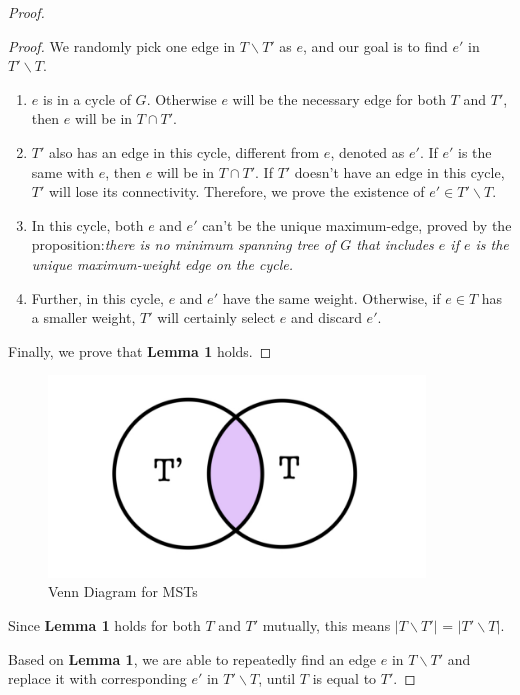 \documentclass[12pt,a4paper]{article}
\theoremstyle{definition}
\begin{document}
\begin{enumerate}
\begin{enumerate}
\begin{proof}
\begin{proof}
		We randomly pick one edge in $T\backslash T'$ as $e$, and our goal is to find $e'$ in $T'\backslash T$.
		\begin{enumerate}
		    \item 
		$e$ is in a cycle of $G$. Otherwise $e$ will be the necessary edge for both $T$ and $T'$, then $e$ will be in $T\cap T'$.
	
	    \item
	    $T'$ also has an edge in this cycle, different from $e$, denoted as $e'$. If $e'$ is the same with $e$, then $e$ will be in $T\cap T'$. If $T'$ doesn't have an edge in this cycle, $T'$ will lose its connectivity. Therefore, we prove the existence of $e'\in T'\backslash T$.
	    	\item
	    In this cycle, both $e$ and $e'$ can't be the unique maximum-edge, proved by the proposition:\textit{there is no minimum spanning tree of $G$ that includes $e$ if $e$ is the unique maximum-weight edge on the cycle.} 
	    \item
	    Further, in this cycle, $e$ and $e'$ have the same weight. Otherwise, if $e\in T$ has a smaller weight, $T'$ will certainly select $e$ and discard $e'$.
		\end{enumerate}
		Finally, we prove that \textbf{Lemma 1} holds.
		
		\end{proof}
		
		\begin{figure}[H]
		    \centering
		    \includegraphics[width=10cm]{set.jpg}
		    \caption{Venn Diagram for MSTs}
		    \label{set}
		\end{figure}
		
		Since \textbf{Lemma 1} holds for both $T$ and $T'$ mutually, this means $|T\backslash T'|$ = $|T' \backslash T|$.
		
		Based on \textbf{Lemma 1}, we are able to repeatedly find an edge $e$ in $T\backslash T'$ and replace it with corresponding $e'$ in $T'\backslash T$, until $T$ is equal to $T'$.
		\end{proof}
		

\end{enumerate}
\end{enumerate}
\end{document}
